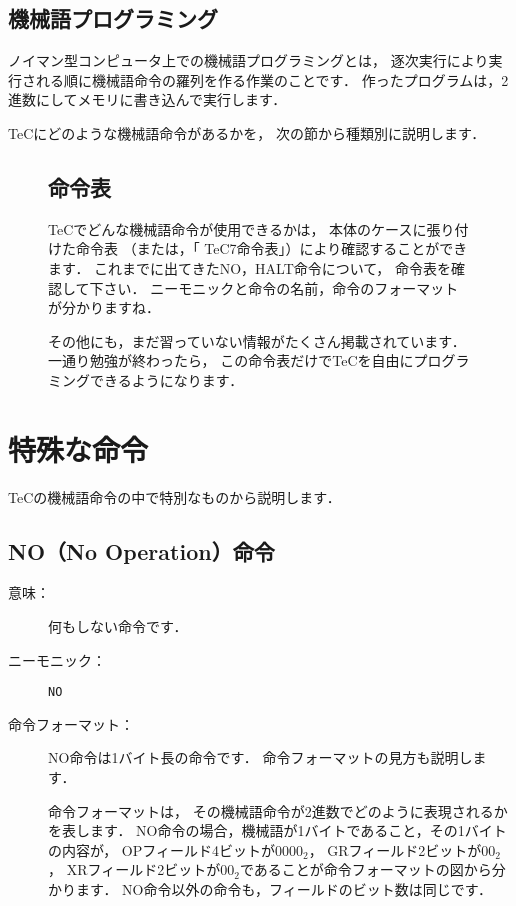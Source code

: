 \subsection{機械語プログラミング}
ノイマン型コンピュータ上での機械語プログラミングとは，
逐次実行により実行される順に機械語命令の羅列を作る作業のことです．
作ったプログラムは，2進数にしてメモリに書き込んで実行します．

TeCにどのような機械語命令があるかを，
次の節から種類別に説明します．

\begin{figure}[btp]
\begin{framed}
\subsection*{命令表}
TeCでどんな機械語命令が使用できるかは，
本体のケースに張り付けた命令表
（または，「 TeC7命令表」）により確認することができます．
これまでに出てきたNO，HALT命令について，
命令表を確認して下さい．
ニーモニックと命令の名前，命令のフォーマットが分かりますね．

その他にも，まだ習っていない情報がたくさん掲載されています．
一通り勉強が終わったら，
この命令表だけでTeCを自由にプログラミングできるようになります．
\end{framed}
\end{figure}

\newpage
\section{特殊な命令}
TeCの機械語命令の中で特別なものから説明します．

\subsection{NO（No Operation）命令}
\begin{description}
\item[意味：]何もしない命令です．

\item[ニーモニック：] {\tt NO}

\item[命令フォーマット：] NO命令は1バイト長の命令です．
命令フォーマットの見方も説明します．


命令フォーマットは，
その機械語命令が2進数でどのように表現されるかを表します．
NO命令の場合，機械語が1バイトであること，その1バイトの内容が，
OPフィールド4ビットが$0000_2$，
GRフィールド2ビットが$00_2$，
XRフィールド2ビットが$00_2$であることが命令フォーマットの図から分かります．
NO命令以外の命令も，フィールドのビット数は同じです．
\end{description}


